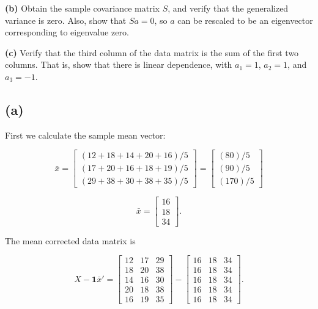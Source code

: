 \documentclass{article}
\begin{document}
\vspace{0.2cm}

\noindent
\textbf{(b)} Obtain the sample covariance matrix $S$, and verify that
the generalized variance is zero. Also, show that $Sa=0$, so $a$ can
be rescaled to be an eigenvector corresponding to eigenvalue zero.

\vspace{0.2cm}

\noindent
\textbf{(c)} Verify that the third column of the data matrix is the sum
of the first two columns. That is, show that there is linear
dependence, with $a_1=1$, $a_2=1$, and $a_3=-1$.

\vspace{0.5cm}


\subsection*{(a)}

First we calculate the sample mean vector:

$$
\bar{x}
=
\begin{bmatrix}
(12+18+14+20+16)/5\\
(17+20+16+18+19)/5\\
(29+38+30+38+35)/5
\end{bmatrix}
=
\begin{bmatrix}
(80)/5\\
(90)/5\\
(170)/5
\end{bmatrix}
$$

$$
\bar{x}
=
\begin{bmatrix}
16\\
18\\
34
\end{bmatrix}.
$$

The mean corrected data matrix is

$$
X-\mathbf{1}\bar{x}'
=
\begin{bmatrix}
12&17&29\\
18&20&38\\
14&16&30\\
20&18&38\\
16&19&35
\end{bmatrix}
-
\begin{bmatrix}
16&18&34\\
16&18&34\\
16&18&34\\
16&18&34\\
16&18&34
\end{bmatrix}.
$$
\end{document}
